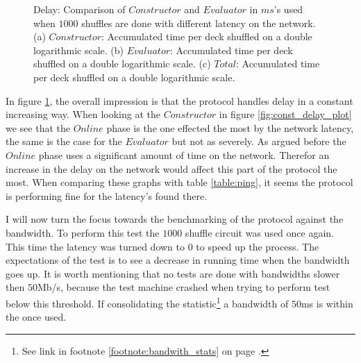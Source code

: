 \documentclass[twoside,11pt,openright]{report}
\begin{document}
\begin{figure}
    \vspace*{0cm}

    \begin{subfigure}{\textwidth}
        \centering
        \caption{}
        \label{fig:total_delay_plot}
    \end{subfigure}
    \caption{Delay: Comparison of $Constructor$ and $Evaluator$ in $ms$'s used when $1000$ shuffles are done with different latency on the network. (a) $Constructor$: Accumulated time per deck shuffled on a double logarithmic scale. (b) $Evaluator$: Accumulated time per deck shuffled on a double logarithmic scale. (c) $Total$: Accumulated time per deck shuffled on a double logarithmic scale.}
    \label{fig:mesurement_delay}
\end{figure}

In figure \ref{fig:total_delay_plot}, the overall impression is that the protocol handles delay in a constant increasing way. When looking at the $Constructor$ in figure \ref{fig:const_delay_plot} we see that the $Online$ phase is the one effected the most by the network latency, the same is the case for the $Evaluator$ but not as severely. As argued before the $Online$ phase uses a significant amount of time on the network. Therefor an increase in the delay on the network would affect this part of the protocol the most. When comparing these graphs with table \ref{table:ping}, it seems the protocol is performing fine for the latency's found there.

\bigskip

I will now turn the focus towards the benchmarking of the protocol against the bandwidth. To perform this test the $1000$ shuffle circuit was used once again. This time the latency was turned down to $0$ to speed up the process. The expectations of the test is to see a decrease in running time when the bandwidth goes up. It is worth mentioning that no tests are done with bandwidths slower then $50$Mb/s, because the test machine crashed when trying to perform test below this threshold. If consolidating the statistic\footnote{See link in footnote \ref{footnote:bandwith_stats} on page \pageref{footnote:bandwith_stats}.} a bandwidth of $50$ms is within the once used. 
\end{document}
